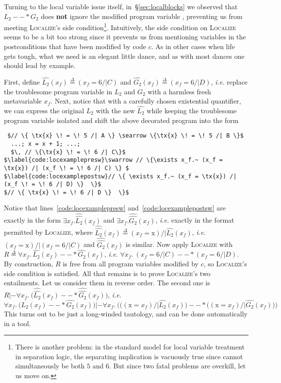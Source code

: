 \documentclass[acmsmall,review,anonymous]{acmart}\settopmatter{printfolios=true,printccs=false,printacmref=false}
\newcommand{\defeq}{\mathbin{\stackrel{\Delta}{=}}}
\newcommand{\tx}[1]{\text{#1}}
\newcommand{\infrulestyle}[1]{\textsc{#1}}
\begin{document}
Turning to the local variable issue itself, in~\S\ref{sec:localblocks} we observed 
that $L_2 --* G_2$ does \textbf{not} ignore the modified program variable \tx{x}, 
preventing us from meeting \infrulestyle{Localize}'s side condition\footnote{There is 
another problem: in the standard model for local variable treatment in separation logic, 
the separating implication is vacuously true since \tx{x} cannot simultaneously be 
both $5$ and $6$.  But since two fatal problems are overkill, let us move on.}.  
Intuitively, the side condition on \infrulestyle{Localize} seems to be a bit too strong 
since it prevents us from mentioning variables in the postconditions that have been modified 
by code $c$.  As in other cases when life gets tough, what we need is an elegant little dance, and as with most dances one should lead by example.

First, define $\hat{L_2}(x_f) \defeq (x_f \! = \! 6 /| C)$ and
$\hat{G_2}(x_f) \defeq (x_f \! = \! 6 /| D)$, \emph{i.e.} replace the troublesome program variable \tx{x} in $L_2$ and $G_2$ with a harmless fresh metavariable $x_f$.  Next, notice that with a carefully chosen existential quantifier, we can express the original $L_2$ with the new $\hat{L_2}$
while keeping the troublesome program variable \tx{x} isolated and shift the above decorated program
into the form
\begin{lstlisting} $// \{ \tx{x} \! = \! 5 /| A \} \searrow \{\tx{x} \! = \! 5 /| B \}$
  ...; x = x + 1; ...;
  $\, // \{\tx{x} \! = \! 6 /| C\}$
$\label{code:locexamplepresw}\swarrow // \{\exists x_f.~ (x_f = \tx{x}) /| (x_f \! = \! 6 /| C) \} $
$\label{code:locexamplepostsw}// \{ \exists x_f.~ (x_f = \tx{x}) /| (x_f \! = \! 6 /| D) \}  \}$
$// \{ \tx{x} \! = \! 6 /| D \}  \}$
\end{lstlisting}
Notice that lines~\ref{code:locexamplepresw} and~\ref{code:locexamplepostsw}
are exactly in the form $\exists x_f. \hat{\hat{L_2}}(x_f)$ and $\exists x_f. \hat{\hat{G_2}}(x_f)$, \emph{i.e.} exactly in the format permitted by \textsc{Localize}, where $\hat{\hat{L_2}}(x_f) \defeq (x_f = \tx{x}) /| \hat{L_2}(x_f)$, \emph{i.e.} $(x_f = \tx{x}) /| (x_f \! = \! 6 /| C)$ and $\hat{\hat{G_2}}(x_f)$ is similar. Now apply \textsc{Localize} with $R \defeq \forall x_f.~\hat{L_2}(x_f) --* \hat{G_2}(x_f)$, \emph{i.e.} $\forall x_f.~(x_f \! = \! 6 /| C) --* (x_f \! = \! 6 /| D)$.  By construction, $R$
is free from all program variables modified by $c$, so \textsc{Localize}'s side condition is
satisfied.  All that remains is to prove \textsc{Localize}'s two entailments.  Let us consider
them in reverse order.  The second one is $R |- \forall x_f.~ \big(\hat{\hat{L_2}}(x_f) --* \hat{\hat{G_2}}(x_f)\big)$, \emph{i.e.}
\[
\forall x_f.~\big(\hat{L_2}(x_f) --* \hat{G_2}(x_f)\big) |- \forall x_f.~\Big(\big((\tx{x} = x_f) /| \hat{L_2}(x_f)\big) --* \big((\tx{x} = x_f) /| \hat{G_2}(x_f)\big)\Big)
\]
This turns out to be just a long-winded tautology, and can be done automatically in a tool.
\end{document}
